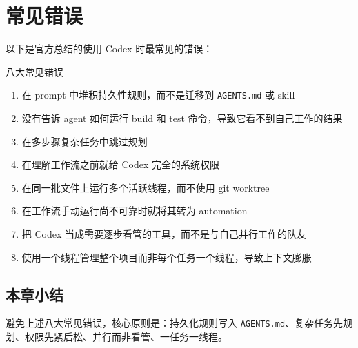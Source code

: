 \section{常见错误}

以下是官方总结的使用 Codex 时最常见的错误：

\begin{warningbox}{八大常见错误}
\begin{enumerate}[nosep]
    \item 在 prompt 中堆积持久性规则，而不是迁移到 \texttt{AGENTS.md} 或 skill
    \item 没有告诉 agent 如何运行 build 和 test 命令，导致它看不到自己工作的结果
    \item 在多步骤复杂任务中跳过规划
    \item 在理解工作流之前就给 Codex 完全的系统权限
    \item 在同一批文件上运行多个活跃线程，而不使用 git worktree
    \item 在工作流手动运行尚不可靠时就将其转为 automation
    \item 把 Codex 当成需要逐步看管的工具，而不是与自己并行工作的队友
    \item 使用一个线程管理整个项目而非每个任务一个线程，导致上下文膨胀
\end{enumerate}
\end{warningbox}

\subsection{本章小结}

避免上述八大常见错误，核心原则是：持久化规则写入 \texttt{AGENTS.md}、复杂任务先规划、权限先紧后松、并行而非看管、一任务一线程。

